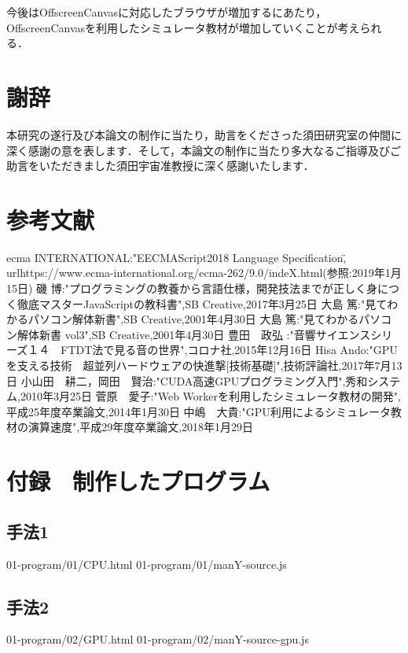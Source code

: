 \documentclass[a4j,12pt]{jsarticle}
\begin{document}
今後はOffscreenCanvasに対応したブラウザが増加するにあたり，OffscreenCanvasを利用したシミュレータ教材が増加していくことが考えられる．
\newpage

\section{謝辞}
本研究の遂行及び本論文の制作に当たり，助言をくださった須田研究室の仲間に深く感謝の意を表します．そして，本論文の制作に当たり多大なるご指導及びご助言をいただきました須田宇宙准教授に深く感謝いたします．
\newpage

\section{参考文献}
\begin{thebibliography}{99}
 ecma INTERNATIONAL:"EECMAScript2018 Language Specification\" , url{https://www.ecma-international.org/ecma-262/9.0/indeX.html}(参照:2019年1月15日)
磯 博:"プログラミングの教養から言語仕様，開発技法までが正しく身につく徹底マスターJavaScriptの教科書",SB Creative,2017年3月25日
大島 篤:"見てわかるパソコン解体新書",SB Creative,2001年4月30日
大島 篤:"見てわかるパソコン解体新書 vol3",SB Creative,2001年4月30日
豊田　政弘 :"音響サイエンスシリーズ１４　FTDT法で見る音の世界",コロナ社,2015年12月16日
Hisa Ando:"GPUを支える技術　超並列ハードウェアの快進撃[技術基礎]",技術評論社,2017年7月13日
小山田　耕二，岡田　賢治:"CUDA高速GPUプログラミング入門",秀和システム,2010年3月25日
菅原　愛子:"Web Workerを利用したシミュレータ教材の開発",平成25年度卒業論文,2014年1月30日
中嶋　大貴:"GPU利用によるシミュレータ教材の演算速度",平成29年度卒業論文,2018年1月29日
\end{thebibliography}
\newpage

\section{付録　制作したプログラム}
\subsection{手法1}
 {01-program/01/CPU.html}
\newpage
 {01-program/01/manY-source.js}
\newpage

\subsection{手法2}
 {01-program/02/GPU.html}
\newpage
 {01-program/02/manY-source-gpu.js}
\newpage
\end{document}
